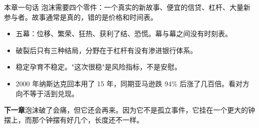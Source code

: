\begin{takeaway}{本章一句话}
泡沫需要四个零件：一个真实的新故事、便宜的信贷、杠杆、大量新参与者。故事通常是真的，错的是价格和时间表。

\begin{itemize}
  \item 五幕：位移、繁荣、狂热、获利了结、恐慌。幕与幕之间没有时刻表。
  \item 破裂后只有三种结局，分野在于杠杆有没有渗进银行体系。
  \item 稳定孕育不稳定。"这次很稳"是风险指标，不是安慰。
  \item 2000 年纳斯达克回本用了 15 年，同期亚马逊跌 94\% 后涨了几百倍。看对方向不等于活到兑现。
\end{itemize}

\end{takeaway}

\begin{bridgebox}
\textbf{下一章}泡沫破了会痛，但它还会再来。因为它不是孤立事件，它挂在一个更大的钟摆上，而那个钟摆有好几个，长度还不一样。
\end{bridgebox}

